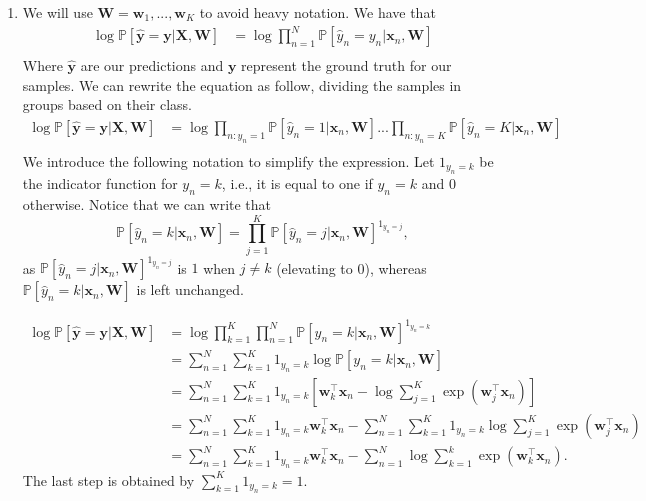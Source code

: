 \documentclass{../../tex_import/ETHuebung_english_theory}
\begin{document}
\begin{enumerate}
	\item We will use $\mathbf{W} = \mathbf{w}_1, ..., \mathbf{w}_K$ to avoid heavy notation. We have that
	\begin{align*}
		\log \mathbb{P}[\mathbf{\hat{y}} = \mathbf{y} | \mathbf{X}, \mathbf{W}] &= \log \prod_{n=1}^N \mathbb{P}[\hat{y}_n = y_n | \mathbf{x}_n, \mathbf{W}] \\
	\end{align*}
	Where $\mathbf{\hat{y}}$ are our predictions and $\mathbf{y}$ represent the ground truth for our samples. We can rewrite the equation as follow, dividing the samples in groups based on their class.
	\begin{align*}
		\log \mathbb{P}[\mathbf{\hat{y}} = \mathbf{y} | \mathbf{X}, \mathbf{W}] &= \log \prod_{n : y_n=1} \mathbb{P}[\hat{y}_n = 1 | \mathbf{x}_n, \mathbf{W}] ... \prod_{n : y_n=K} \mathbb{P}[\hat{y}_n = K | \mathbf{x}_n, \mathbf{W}] \\
	\end{align*}
	We introduce the following notation to simplify the expression. Let $1_{y_n = k}$ be the indicator function for $y_n = k$, i.e., it is equal to one if $y_n = k$ and 0 otherwise. Notice that we can write that 
\[	\mathbb{P}[\hat{y}_n = k | \mathbf{x}_n, \mathbf{W}] = \prod_{j=1}^K \mathbb{P}[\hat{y}_n = j | \mathbf{x}_n, \mathbf{W}]^{1_{y_n = j}}, 	\]
as $\mathbb{P}[\hat{y}_n = j | \mathbf{x}_n, \mathbf{W}]^{1_{y_n = j}}$ is $1$ when $j \not= k$ (elevating to 0), whereas $\mathbb{P}[\hat{y}_n = k | \mathbf{x}_n, \mathbf{W}]$ is left unchanged.
	
	\begin{align*}
		\log \mathbb{P}[\mathbf{\hat{y}} = \mathbf{y} | \mathbf{X}, \mathbf{W}] &= \log \prod_{k=1}^K \prod_{n=1}^N \mathbb{P}[y_n = k | \mathbf{x}_n, \mathbf{W}]^{1_{y_n = k}} \\
		&= \sum_{n=1}^N \sum_{k=1}^K 1_{y_n = k} \log \mathbb{P}[y_n = k | \mathbf{x}_n, \mathbf{W}] \\
		&= \sum_{n=1}^N \sum_{k=1}^K 1_{y_n = k} \left[\mathbf{w}_k^\top\mathbf{x}_n - \log \sum_{j=1}^K \exp(\mathbf{w}_j^\top\mathbf{x}_n)\right] \\
		&= \sum_{n=1}^N \sum_{k=1}^K 1_{y_n = k} \mathbf{w}_k^\top\mathbf{x}_n - \sum_{n=1}^N \sum_{k=1}^K 1_{y_n = k} \log \sum_{j=1}^K \exp(\mathbf{w}_j^\top\mathbf{x}_n) \\
		&= \sum_{n=1}^N \sum_{k=1}^K 1_{y_n = k} \mathbf{w}_k^\top\mathbf{x}_n - \sum_{n=1}^N \log \sum_{k=1}^k \exp(\mathbf{w}_k^\top\mathbf{x}_n).
	\end{align*}
	The last step is obtained by $\sum_{k=1}^K 1_{y_n = k} = 1$.
	

\end{enumerate}
\end{document}
